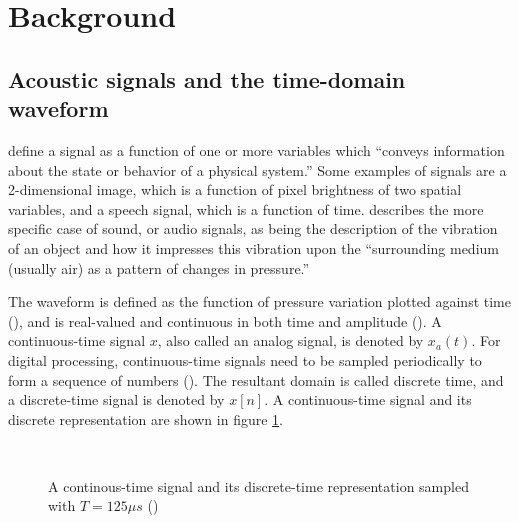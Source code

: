 \documentclass[report.tex]{subfiles}
\begin{document}
\section{Background}
\label{sec:background}

\subsection{Acoustic signals and the time-domain waveform}
\label{sec:timedomain}

\textcite[Chapter~2]{discretebook} define a signal as a function of one or more variables which ``conveys information about the state or behavior of a physical system.'' Some examples of signals are a 2-dimensional image, which is a function of pixel brightness of two spatial variables, and a speech signal, which is a function of time. \textcite[Chapter~2]{moore} describes the more specific case of sound, or audio signals, as being the description of the vibration of an object and how it impresses this vibration upon the ``surrounding medium (usually air) as a pattern of changes in pressure.''

The waveform is defined as the function of pressure variation plotted against time (\cite{moore, melbook}), and is real-valued and continuous in both time and amplitude (\cite[Chapter~2]{melbook}). A continuous-time signal $x$, also called an analog signal, is denoted by $x_{a}(t)$. For digital processing, continuous-time signals need to be sampled periodically to form a sequence of numbers (\cite[Chapter~2]{discretebook}). The resultant domain is called discrete time, and a discrete-time signal is denoted by $x[n]$.  A continuous-time signal and its discrete representation are shown in figure \ref{fig:discretecontinuous}.

\begin{figure}[ht]
	\centering
	\\
	\caption{A continous-time signal and its discrete-time representation sampled with $T = 125\mu s$ (\cite[Chapter~2]{discretebook})}
	\label{fig:discretecontinuous}
\end{figure}
\end{document}
